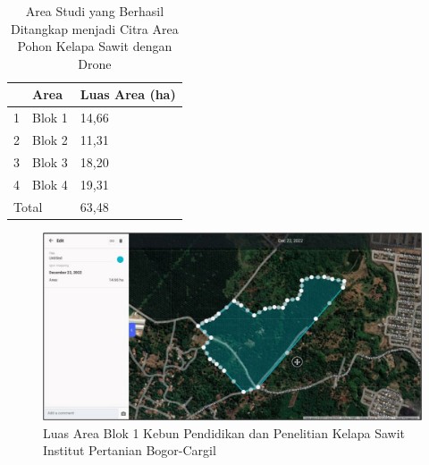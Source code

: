 \begin{singlespace}
	\begin{table}[H]
		\centering
		\caption{Area Studi yang Berhasil Ditangkap menjadi Citra Area Pohon Kelapa Sawit dengan Drone}
		\label{tbl:Area-Studi-Yang-Berhasil-Ditangkap-Menjadi-CItra-Area-Pohon-Kelapa-Sawit-Dengan-Drone}
		\begin{tabular}{|ll|l|}
			\hline
			\rowcolor[HTML]{D9D9D9} 
			\multicolumn{1}{|l|}{\cellcolor[HTML]{D9D9D9}No.} & Area   & Luas Area (ha) \\ \hline
			\multicolumn{1}{|l|}{1}                           & Blok 1 & 14,66          \\ \hline
			\multicolumn{1}{|l|}{2}                           & Blok 2 & 11,31          \\ \hline
			\multicolumn{1}{|l|}{3}                           & Blok 3 & 18,20          \\ \hline
			\multicolumn{1}{|l|}{4}                           & Blok 4 & 19,31          \\ \hline
			\multicolumn{2}{|l|}{Total}                                & 63,48          \\ \hline
		\end{tabular}
	\end{table}
\end{singlespace}

\begin{figure}[H]
	\vspace{-0.1cm}
	\begin{center}
		\includegraphics[width=0.7\columnwidth]{bab4/Gambar/Picture2.jpg}
	\end{center}
	\vspace{-0.2cm}
	\captionsetup{justification=centering}
	\caption{Luas Area Blok 1 Kebun Pendidikan dan Penelitian Kelapa Sawit Institut Pertanian Bogor-Cargil}\label{img:Luas-Area-Blok-1-Kebun-Pendidikan}
\end{figure}

